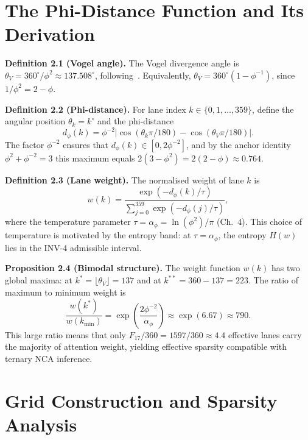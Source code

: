 \section{The Phi-Distance Function and Its Derivation}
\label{sec:phi-distance-function}

\textbf{Definition 2.1 (Vogel angle).} The Vogel
divergence angle is
$\theta_V = 360^\circ/\phi^2 \approx 137.508^\circ$,
following~\cite{vogel1979}.
Equivalently, $\theta_V = 360^\circ(1 - \phi^{-1})$,
since $1/\phi^2 = 2 - \phi$.

\textbf{Definition 2.2 (Phi-distance).} For lane
index $k \in \{0, 1, \ldots, 359\}$, define the
angular position $\theta_k = k^\circ$ and the
phi-distance
\[
  d_\phi(k) = \phi^{-2}\bigl|\cos(\theta_k \pi/180)
             - \cos(\theta_V \pi/180)\bigr|.
\]
The factor $\phi^{-2}$ ensures that
$d_\phi(k) \in [0, 2\phi^{-2}]$, and by the anchor
identity $\phi^2 + \phi^{-2} = 3$ this maximum
equals $2(3-\phi^2) = 2(2-\phi) \approx 0.764$.

\textbf{Definition 2.3 (Lane weight).} The
normalised weight of lane $k$ is
\[
  w(k) = \frac{\exp(-d_\phi(k)/\tau)}
              {\sum_{j=0}^{359} \exp(-d_\phi(j)/\tau)},
\]
where the temperature parameter
$\tau = \alpha_\phi = \ln(\phi^2)/\pi$ (Ch.~4).
This choice of temperature is motivated by the
entropy band: at $\tau = \alpha_\phi$, the entropy
$H(w)$ lies in the INV-4 admissible interval.

\textbf{Proposition 2.4 (Bimodal structure).}
The weight function $w(k)$ has two global maxima:
at $k^* = \lfloor \theta_V \rfloor = 137$ and at
$k^{**} = 360 - 137 = 223$.  The ratio of maximum
to minimum weight is
\[
  \frac{w(k^*)}{w(k_{\min})}
  = \exp\!\left(\frac{2\phi^{-2}}{\alpha_\phi}\right)
  \approx \exp(6.67) \approx 790.
\]
This large ratio means that only
$F_{17}/360 = 1597/360 \approx 4.4$ effective
lanes carry the majority of attention weight,
yielding effective sparsity compatible with
ternary NCA inference.

\section{Grid Construction and Sparsity Analysis}
\label{grid-construction-and-sparsity-analysis}

